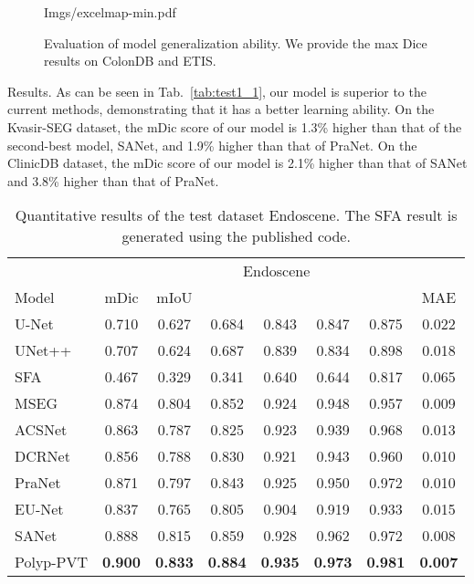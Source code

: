 \documentclass[journal]{IEEEtran}
\newcommand{\tabref}[1]{Tab.~\ref{#1}}
\def\ourmodel{Polyp-PVT}
\begin{document}
\begin{figure}[t!]
	\centering
	\vspace{5pt}
	\begin{overpic}[width=.8\linewidth]{Imgs/excelmap-min.pdf}
    \end{overpic}
    \vspace{-5pt}
	\caption{Evaluation of model generalization ability. We provide the max Dice results on ColonDB and ETIS.}
    \label{figure:generalization ability}
\end{figure}

\textcolor[RGB]{31,100,212}{Results.} As can be seen in \tabref{tab:test1_1}, our model is superior to the current methods, demonstrating that it has a better learning ability.
On the Kvasir-SEG dataset, the mDic score of our model is 1.3\% higher than that of the second-best model, SANet, and 1.9\% higher than that of PraNet. 
On the ClinicDB dataset, the mDic score of our model is 2.1\% higher than that of SANet and 3.8\% higher than that of PraNet.



\begin{table}
 \centering
 \small
	\caption{Quantitative results of the test dataset Endoscene. The SFA result is generated using the published code.}\label{tab:test1_3}
	\renewcommand{\arraystretch}{0.8}
	\setlength\tabcolsep{3.0pt}
    \begin{tabular}{l|ccccccc}
    \hline
     & \multicolumn{7}{c}{Endoscene~\cite{vazquez2017benchmark}} \\
\cline{2-8}    Model & mDic & mIoU &    &     &     &  & MAE \\
    \hline
    U-Net  & 0.710  & 0.627  & 0.684  & 0.843  & 0.847    & 0.875& 0.022    \\
    UNet++ & 0.707  & 0.624  & 0.687  & 0.839  & 0.834  & 0.898  & 0.018   \\
    SFA   & 0.467  & 0.329  & 0.341  & 0.640  & 0.644    & 0.817 & 0.065  \\
    MSEG & 0.874  & 0.804  & 0.852  & 0.924  & 0.948    & 0.957 & 0.009   \\
ACSNet & 0.863  & 0.787  & 0.825  & 0.923  & 0.939  & 0.968  & 0.013  \\
DCRNet & 0.856  & 0.788  & 0.830  & 0.921  & 0.943   & 0.960   & 0.010  \\
    PraNet & 0.871  & 0.797  & 0.843  & 0.925  & 0.950   & 0.972 & 0.010    \\
    EU-Net & 0.837  & 0.765  & 0.805  & 0.904  & 0.919    & 0.933  & 0.015  \\
    SANet & 0.888  & 0.815  & 0.859  & 0.928  & 0.962   & 0.972  & 0.008  \\
    \hline
    \rowcolor{gray!30}
    \ourmodel & \textbf{0.900} & \textbf{0.833} & \textbf{0.884} & \textbf{0.935} & \textbf{0.973}& \textbf{0.981}   & \textbf{0.007}  \\
    \hline
    \end{tabular}
\end{table}
\end{document}
